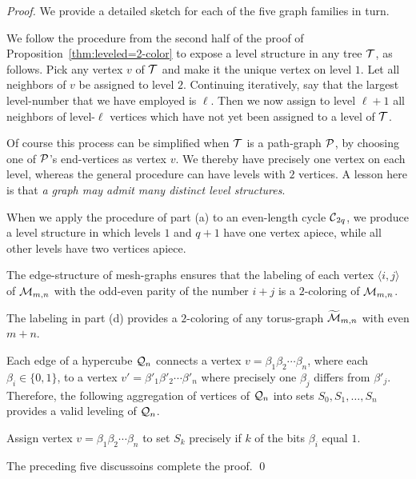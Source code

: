 \begin{proof}
We provide a detailed sketch for each of the five graph families in turn.

We follow the procedure from the second half of the proof of
Proposition~\ref{thm:leveled=2-color} to expose a level structure in
any tree $\mbox{$\cal T$}$, as follows.  Pick any vertex $v$ of $\mbox{$\cal T$}$ and make it the
unique vertex on level $1$.  Let all neighbors of $v$ be assigned to
level $2$.  Continuing iteratively, say that the largest level-number
that we have employed is $\ell$.  Then we now assign to level $\ell
+1$ all neighbors of level-$\ell$ vertices which have not yet been
assigned to a level of $\mbox{$\cal T$}$.

Of course this process can be simplified when $\mbox{$\cal T$}$ is a path-graph
$\mbox{$\cal P$}$, by choosing one of $\mbox{$\cal P$}$'s end-vertices as vertex $v$.  We thereby
have precisely one vertex on each level, whereas the general procedure
can have levels with $2$ vertices.  A lesson here is that {\em a graph
  may admit many distinct level structures}.

\medskip

When we apply the procedure of part (a) to an even-length cycle
$\mbox{$\cal C$}_{2q}$, we produce a level structure in which levels $1$ and $q+1$
have one vertex apiece, while all other levels have two vertices apiece.

\medskip

The edge-structure of mesh-graphs ensures that the labeling of each
vertex $\langle i,j \rangle$ of $\mbox{$\cal M$}_{m,n}$ with the odd-even parity of
the number $i+j$ is a $2$-coloring of $\mbox{$\cal M$}_{m,n}$.

\medskip

The labeling in part (d) provides a $2$-coloring of any torus-graph
$\widetilde{\mbox{$\cal M$}}_{m,n}$ with even $m+n$.

\medskip

Each edge of a hypercube $\mbox{$\cal Q$}_n$ connects a vertex $v = \beta_1 \beta_2
\cdots \beta_n$, where each $\beta_i \in \{0,1\}$, to a vertex $v' =
\beta'_1 \beta'_2 \cdots \beta'_n$ where precisely one $\beta_j$
differs from $\beta'_j$.  Therefore, the following aggregation of
vertices of $\mbox{$\cal Q$}_n$ into sets $S_0, S_1, \ldots, S_n$ provides a valid
leveling of $\mbox{$\cal Q$}_n$.

\smallskip

Assign vertex $v = \beta_1 \beta_2 \cdots \beta_n$ to set $S_k$
precisely if $k$ of the bits $\beta_i$ equal $1$.

\medskip

\noindent
The preceding five discussoins complete the proof.
\qed
\end{proof}

